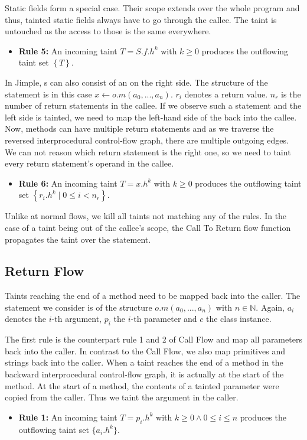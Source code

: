 \documentclass[../draft.tex]{subfiles}
\begin{document}
    Static fields form a special case.
    Their scope extends over the whole program and thus, tainted static fields always have to go through the callee.
    The taint is untouched as the access to those is the same everywhere.
    \begin{itemize}
        \item[] \textbf{Rule 5:} An incoming taint $T = S.f.h^k$ with $k \geq 0$ produces the outflowing taint set $\left\{T\right\}$.
    \end{itemize}

    In Jimple, s can also consist of an  on the right side.
    The structure of the statement is in this case $x \leftarrow o.m(a_0,...,a_n)$. $r_i$ denotes a return value.
    $n_r$ is the number of return statements in the callee.
    If we observe such a statement and the left side is tainted, we need to map the left-hand side of the  back into the callee.
    Now, methods can have multiple return statements and as we traverse the reversed interprocedural control-flow graph, there are multiple outgoing edges.
    We can not reason which return statement is the right one, so we need to taint every return statement's operand in the callee.
    \begin{itemize}
        \item[] \textbf{Rule 6:} An incoming taint $T = x.h^k$ with $k \geq 0$ produces the outflowing taint set $\left\{r_i.h^k \mid 0 \leq i < n_r \right\}$.
    \end{itemize}

    Unlike at normal flows, we kill all taints not matching any of the rules.
    In the case of a taint being out of the callee's scope, the Call To Return flow function propagates the taint over the statement.

    \subsection{Return Flow}
    Taints reaching the end of a method need to be mapped back into the caller.
    The statement we consider is of the structure $o.m(a_0, ..., a_n)$ with $n \in \mathbb{N}$.
    Again, $a_i$ denotes the $i$-th argument, $p_i$ the $i$-th parameter and $c$ the class instance.

    The first rule is the counterpart rule 1 and 2 of Call Flow\footnotemark{} and map all parameters back into the caller.
    In contrast to the Call Flow, we also map primitives and strings back into the caller.
    When a taint reaches the end of a method in the backward interprocedural control-flow graph, it is actually at the start of the method.
    At the start of a method, the contents of a tainted parameter were copied from the caller.
    Thus we taint the argument in the caller.
    \begin{itemize}
        \item[] \textbf{Rule 1:} An incoming taint $T = p_i.h^k$ with $k \geq 0 \land 0 \leq i \leq n$ produces the outflowing taint set $\{a_i.h^k\}$.
    \end{itemize}
\end{document}
